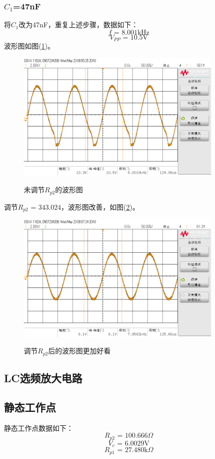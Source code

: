 \documentclass[a4paper]{article}
\begin{document}
\subsubsection{$C_1$=47nF}
将$C_1$改为47nF，重复上述步骤，数据如下：
$$f\text{ = 8.001kHz}$$
$$V_{PP}\text{ = 10.5V}$$
波形图如图(\ref{datafig3})。
\begin{figure}[!h]
\centering
\includegraphics[width=10cm]{fig/scope_3.png}\\
\caption{未调节$R_{p2}$的波形图}\label{datafig3}
\end{figure}

调节$R_{p2}\text{ = 343.024}$，波形图改善，如图(\ref{datafig4})。
\begin{figure}[!h]
\centering
\includegraphics[width=10cm]{fig/scope_4.png}\\
\caption{调节$R_{p2}$后的波形图更加好看}\label{datafig4}
\end{figure}
\subsection{LC选频放大电路}
\subsection{静态工作点}
静态工作点数据如下：
$$R_{p2}\text{ = 100.666}\Omega$$
$$V_c\text{ = 6.0029V}$$
$$R_{p1}\text{ = 27.480k}\Omega$$
\end{document}
